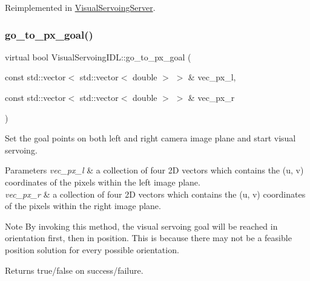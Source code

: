 Reimplemented in \hyperlink{classVisualServoingServer_a77f26ac40c67d7a9b7e4ad7840532681}{Visual\+Servoing\+Server}.

\mbox{\label{classVisualServoingIDL_a75929f915651161c43ed032e9f69a361}} 
\subsubsection{\texorpdfstring{go\+\_\+to\+\_\+px\+\_\+goal()}{go\_to\_px\_goal()}}
{\footnotesize\ttfamily virtual bool Visual\+Servoing\+I\+D\+L\+::go\+\_\+to\+\_\+px\+\_\+goal (\begin{DoxyParamCaption}\item[{const std\+::vector$<$ std\+::vector$<$ double $>$ $>$ \&}]{vec\+\_\+px\+\_\+l,  }\item[{const std\+::vector$<$ std\+::vector$<$ double $>$ $>$ \&}]{vec\+\_\+px\+\_\+r }\end{DoxyParamCaption})\hspace{0.3cm}{\ttfamily [virtual]}}



Set the goal points on both left and right camera image plane and start visual servoing. 


\begin{DoxyParams}{Parameters}
{\em vec\+\_\+px\+\_\+l} & a collection of four 2D vectors which contains the (u, v) coordinates of the pixels within the left image plane. \\
\hline
{\em vec\+\_\+px\+\_\+r} & a collection of four 2D vectors which contains the (u, v) coordinates of the pixels within the right image plane. \\
\hline
\end{DoxyParams}
\begin{DoxyNote}{Note}
By invoking this method, the visual servoing goal will be reached in orientation first, then in position. This is because there may not be a feasible position solution for every possible orientation. 
\end{DoxyNote}
\begin{DoxyReturn}{Returns}
true/false on success/failure. 
\end{DoxyReturn}
\mbox{\label{classVisualServoingIDL_a99974ef8858179f14e2762c2d7bf4ed5}} 
